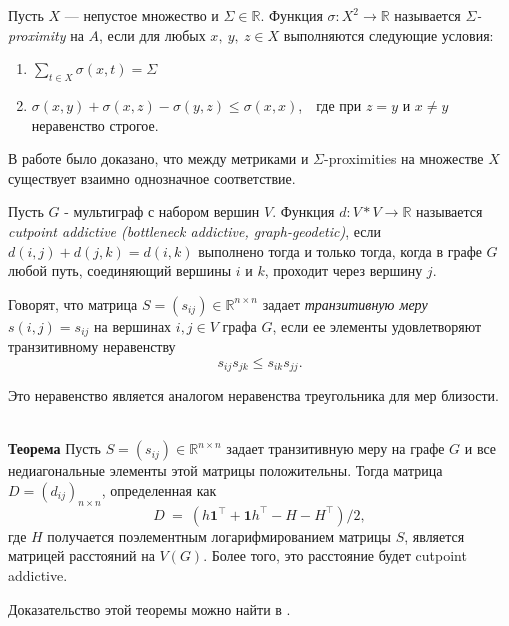 \begin{definition}
Пусть $X$ --- непустое множество и $\Sigma \in \mathbb{R}$. Функция $\sigma: X^2 \rightarrow \mathbb{R}$ называется $\Sigma$\emph{-proximity} на $A$, если для любых $x,\ y,\ z \in X$ выполняются следующие условия:
\begin{enumerate}
\item $\sum\limits_{t \in X} \sigma (x,t) = \Sigma$
\item $\sigma(x,y) + \sigma(x,z) - \sigma(y,z) \le \sigma(x,x)$,\ \  где при $z = y$ и $x \ne y$ неравенство строгое.
\end{enumerate}
\end{definition}

В работе \cite{chebotarev2013studying} было доказано, что между метриками и $\Sigma$-proximities на множестве $X$ существует взаимно однозначное соответствие.

\begin{definition}
Пусть $G$ - мультиграф с набором вершин $V$. Функция $d: V*V \rightarrow \mathbb{R}$ называется \emph{cutpoint addictive (bottleneck addictive, graph-geodetic)}, если $d(i,j)+d(j,k) = d(i,k)$ выполнено тогда и только тогда, когда в графе $G$ любой путь, соединяющий вершины $i$ и $k$, проходит через вершину $j$.
\end{definition}

\begin{definition}
Говорят, что матрица $S=(s_{ij}) \in \mathbb{R}^{n\times n}$ задает \emph{транзитивную меру} $s(i,j) = s_{ij}$ на вершинах $i,j \in V$ графа $G$, если ее элементы удовлетворяют транзитивному неравенству $$s_{ij}s_{jk} \le s_{ik}s_{jj}.$$

Это неравенство является аналогом неравенства треугольника для мер близости.
\end{definition}
\\
\textbf{Теорема}
Пусть $S=(s_{ij}) \in \mathbb{R}^{n\times n}$ задает транзитивную меру на графе $G$ и все недиагональные элементы этой матрицы положительны. Тогда матрица $D = (d_{ij})_{n\times n}$, определенная как
$$D~=~(h \textbf{1}^\intercal + \textbf{1} h^\intercal - H - H ^\intercal) /2,$$ 
где $H$ получается поэлементным логарифмированием матрицы $S$, является матрицей расстояний на $V(G)$. Более того, это расстояние будет cutpoint addictive.

Доказательство этой теоремы можно найти в \cite{von2014hitting}.



